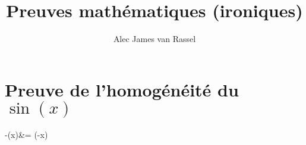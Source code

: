 \documentclass[12pt, titlepage,french]{article}
\begin{document}
\title{Preuves mathématiques (ironiques)}
\vspace{-8ex}
\date{}
\author{Alec James van Rassel}
\maketitle

\tableofcontents
\clearpage

\section*{Preuve de l'homogénéité du $\sin(x)$}

\begin{theorems}[Théorème]
	-\sin(x)&=	\sin(-x) 
\end{theorems}
\end{document}
